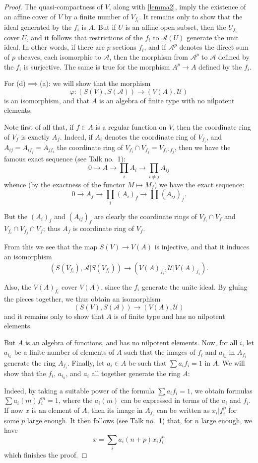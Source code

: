 \documentclass{article}
\theoremstyle{plain}
\newcommand{\sh}{\mathscr}
\newcommand{\oldpage}[1]{\marginpar{\footnotesize$\Big\vert$ \textit{p.~#1}}}
\begin{document}
\begin{proof}
  The quasi-compactness of $V$, along with \cref{lemma2}, imply the existence of an affine cover of $V$ by a finite number of $V_{f_i}$.
  It remains only to show that the ideal generated by the $f_i$ is $A$.
  But if $U$ is an affine open subset, then the $U_{f_i}$ cover $U$, and it follows that restrictions of the $f_i$ to $\sh{A}(U)$ generate the unit ideal.
  In other words, if there are $p$ sections $f_i$, and if $\sh{A}^p$ denotes the direct sum of $p$ sheaves, each isomorphic to $\sh{A}$, then the morphism from $\sh{A}^p$ to $\sh{A}$ defined by the $f_i$ is surjective.
  The same is true for the morphism $A^p\to A$ defined by the $f_i$.

  \bigskip

  For (d)$\implies$(a):
  we will show that the morphism
  \[
    \varphi\colon (S(V),S(\sh{A})) \to (V(A),\sh{U})
  \]
  is an isomorphism, and that $A$ is an algebra of finite type with no nilpotent elements.

  Note first of all that, if $f\in A$ is a regular function on $V$, then the coordinate ring of $V_f$ is exactly $A_f$.
  Indeed, if $A_i$ denotes the coordinate ring of $V_{f_i}$, and $A_{ij}=A_{if_j}=A_{jf_i}$ the coordinate ring of $V_{f_i}\cap V_{f_j}=V_{f_i\cdot f_j}$, then we have the famous exact sequence (see Talk no.~1):
  \[
    0 \to A \to \prod_i A_i \to \prod_{i\neq j}A_{ij}
  \]
  whence (by the exactness of the functor $M\mapsto M_f$) we have the exact sequence:
  \[
    0 \to A_f \to \prod_i(A_i)_f \to \prod(A_{ij})_f.
  \]

  But the $(A_i)_f$ and $(A_{ij})_f$ are clearly the coordinate rings of
\oldpage{2-07}
  $V_{f_i}\cap V_f$ and $V_{f_i}\cap V_{f_j}\cap V_f$;
  thus $A_f$ is coordinate ring of $V_f$.

  From this we see that the map $S(V)\to V(A)$ is injective, and that it induces an isomorphism
  \[
    (S(V_{f_i}), \sh{A}|S(V_{f_i})) \to (V(A)_{f_i}, \sh{U}|V(A)_{f_i}).
  \]

  Also, the $V(A)_{f_i}$ cover $V(A)$, since the $f_i$ generate the unite ideal.
  By gluing the pieces together, we thus obtain an isomorphism
  \[
    (S(V),S(\sh{A})) \to (V(A),\sh{U})
  \]
  and it remains only to show that $A$ is of finite type and has no nilpotent elements.

  But $A$ is an algebra of functions, and has no nilpotent elements.
  Now, for all $i$, let $a_{i_k}$ be a finite number of elements of $A$ such that the images of $f_i$ and $a_{i_k}$ in $A_{f_i}$ generate the ring $A_{f_i}$.
  Finally, let $a_i\in A$ be such that $\sum a_i f_i=1$ in $A$.
  We will show that the $f_i$, $a_{i_k}$, and $a_i$ all together generate the ring $A$:

  Indeed, by taking a suitable power of the formula $\sum a_i f_i=1$, we obtain formulas $\sum a_i(m)f_i^m=1$, where the $a_i(m)$ can be expressed in terms of the $a_i$ and $f_i$.
  If now $x$ is an element of $A$, then its image in $A_{f_i}$ can be written as $x_i|f_i^p$ for some $p$ large enough.
  It then follows (see Talk no.~1) that, for $n$ large enough, we have
  \[
    x = \sum_i a_i(n+p) x_i f_i^n
  \]
  which finishes the proof.
\end{proof}
\end{document}

